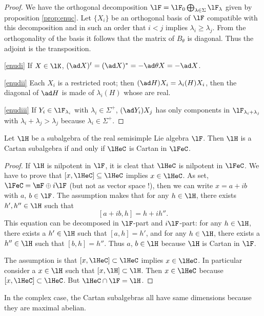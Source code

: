\begin{proof}
We have the orthogonal decomposition $\lF=\lF_0\bigoplus_{\lambda\in\Sigma}\lF_{\lambda}$ given by proposition \ref{prop:enuc}. Let $\{X_i\}$ be an orthogonal basis of $\lF$ compatible with this decomposition and in such an order that $i<j$ implies $\lambda_i\geq\lambda_j$. From the orthogonality of the basis it follows that the matrix of $B_{\theta}$ is diagonal. Thus the adjoint is the transposition.

\ref{enudi} If $X\in\lK$, $(\ad X)^t=(\ad X)^*=-\ad\theta X=-\ad X$.

\ref{enudii} Each $X_i$ is a restricted root; then $(\ad H)X_i=\lambda_i(H)X_i$, then the diagonal of $\ad H$ is made of $\lambda_i(H)$ whose are real.

\ref{enudiii} If $Y_i\in\lF_{\lambda_i}$ with $\lambda_i\in\Sigma^+$, $(\ad Y_i)X_j$ has only components in $\lF_{\lambda_i+\lambda_j}$ with $\lambda_i+\lambda_j>\lambda_j$ because $\lambda_i\in\Sigma^+$.
\end{proof}


\begin{lemma}
Let $\lH$ be a subalgebra of the real semisimple Lie algebra $\lF$. Then $\lH$ is a Cartan subalgebra if and only if $\lHeC$ is Cartan in $\lFeC$.
\end{lemma}

\begin{proof}
 If $\lH$ is nilpotent in $\lF$, it is cleat that $\lHeC$ is nilpotent in $\lFeC$. We have to prove that $[x,\lHeC]\subseteq\lHeC$ implies $x\in\lHeC$. As set, $\lFeC=\mF\oplus i\lF$  (but not as vector space !), then we can write $x=a+ib$ with $a$, $b\in\lF$. The assumption makes that for any $h\in\lH$, there exists $h',h''\in\lH$ such that 
\[
   [a+ib,h]=h+ih''.
\]
This equation can be decomposed in $\lF$-part and $i\lF$-part: for any $h\in\lH$, there exists a $h'\in\lH$ such that $[a,h]=h'$,  and for any $h\in\lH$, there exists a $h''\in\lH$ such that $[b,h]=h''$. Thus $a$, $b\in\lH$ because $\lH$ is Cartan in $\lF$.

 The assumption is that $[x,\lHeC]\subset\lHeC$ implies $x\in\lHeC$. In particular consider a $x\in\lH$ such that $[x,\lH]\subset\lH$. Then $x\in\lHeC$ because $[x,\lHeC]\subset\lHeC$. But $\lHeC\cap\lF=\lH$.
\end{proof}

In the complex case, the Cartan subalgebras all have same dimensions because they are maximal abelian.
